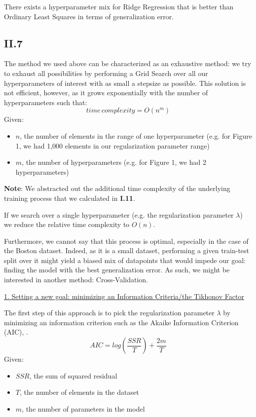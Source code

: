 \documentclass{homework}
\begin{document}
\textcolor{OliveGreen}{There exists a hyperparameter mix for Ridge Regression that is better than Ordinary Least Squares in terms 
of generalization error.}

\subsection*{II.7} 

The method we used above can be characterized as an exhaustive method: we try to exhaust all possibilities by
performing a Grid Search over all our hyperparameters of interest with as small a stepsize as possible. This
solution is not efficient, however, as it grows exponentially with the number of hyperparameters such that:
$${time}\,{complexity}=O(n^m)$$
Given:
\begin{itemize}
    \item $n$, the number of elements in the range of one hyperparameter (e.g. for Figure 1, we had 1,000
    elements in our regularization parameter range)
    \item $m$, the number of hyperparameters (e.g. for Figure 1, we had 2 hyperparameters)
\end{itemize}
\textbf{Note}: We abstracted out the additional time complexity of the underlying training process that we calculated in \textbf{I.11}.

If we search over a single hyperparameter (e.g. the regularization parameter $\lambda$) we reduce the relative time complexity to $O(n)$. 

Furthermore, we cannot say that this process is optimal, especially in the case of the Boston dataset. Indeed, as it is a small dataset,
performing a given train-test split over it might yield a biased mix of datapoints that would impede our goal: finding the model with the 
best generalization error. As such, we might be interested in another method: Cross-Validation.

\underline{1. Setting a new goal: minimizing an Information Criteria/the Tikhonov Factor}

The first step of this approach is to pick the regularization parameter $\lambda$ by minimizing an information criterion such as the 
Akaike Information Criterion (AIC), \cite{micha}.
$$AIC = log(\frac{SSR}{T})+\frac{2m}{T}$$
Given:
\begin{itemize}
    \item $SSR$, the sum of squared residual
    \item $T$, the number of elements in the dataset
    \item $m$, the number of parameters in the model
\end{itemize}
\end{document}
